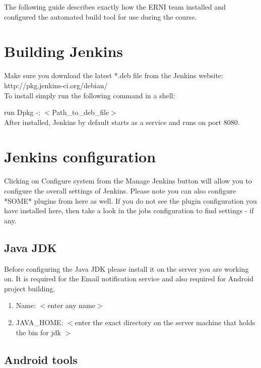 The following guide describes exactly how the ERNI team installed and configured the automated build tool for use during the course. 

\section{Building Jenkins}
Make sure you download the latest *.deb file from the Jenkins website:\\

http://pkg.jenkins-ci.org/debian/\\

To install simply run the following command in a shell:

run Dpkg -; $<$Path\_to\_deb\_file$>$\\

After installed, Jenkins by default starts as a service and runs on port 8080.\\

\section{Jenkins configuration}

Clicking on Configure system  from the Manage Jenkins button will allow you to configure the overall settings of Jenkins. Please note you can also configure *SOME* plugins from here as well. If you do not see the plugin configuration you have installed here, then take a look in the jobs configuration to find settings - if any. 

\subsection {Java JDK}

Before configuring the Java JDK please install it on the server you are working on.
It is required for the Email notification service and also required for Android project building.
\begin{enumerate}
\item Name: $<$enter any name$>$
\item JAVA\_HOME: $<$enter the exact directory on the server machine that holds the bin for jdk $>$ 
\end{enumerate}

\subsection {Android tools}

